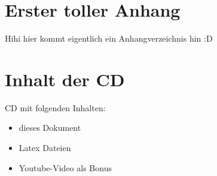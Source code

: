	
\appendix


\section{Erster toller Anhang}
Hihi hier kommt eigentlich ein Anhangverzeichnis hin :D

\section{Inhalt der CD}
CD mit folgenden Inhalten:
\begin{itemize}
	\item dieses Dokument
	\item Latex Dateien
	\item Youtube-Video als Bonus
\end{itemize}
